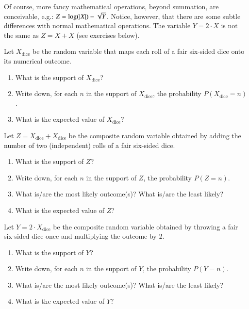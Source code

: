\documentclass[nobib,nofonts]{tufte-handout}
\newcommand{\mult}{\ensuremath{\cdot}}
\begin{document}
Of course, more fancy mathematical operations, beyond summation, are conceivable, e.g.: $Z = \log(\lvert X \rvert) - \sqrt{Y}$.
Notice, however, that there are some subtle differences with normal mathematical operations.
The variable $Y = 2 \mult X$ is not the same as $Z = X + X$ (see exercises below).

\bigskip
\noindent \colorbox{mygray}{\centering
  \begin{minipage}{1.0\textwidth}

    \begin{exercise}
      Let $X_{\text{dice}}$ be the random variable that maps each roll of a fair six-sided dice onto its numerical outcome.
      \begin{enumerate}
        \item What is the support of $X_{\text{dice}}$?
        \item Write down, for each $n$ in the support of $X_{\text{dice}}$, the probability $P(X_{\text{dice}}=n)$.
        \item What is the expected value of $X_{\text{dice}}$?
      \end{enumerate}
    \end{exercise}

    \begin{exercise}
      Let $Z = X_{\text{dice}} + X_{\text{dice}}$ be the composite random variable obtained by adding the number of two (independent) rolls of a fair six-sided dice.
      \begin{enumerate}
        \item What is the support of $Z$?
        \item Write down, for each $n$ in the support of $Z$, the probability $P(Z=n)$.
        \item What is/are the most likely outcome(s)? What is/are the least likely?
        \item What is the expected value of $Z$?
      \end{enumerate}
    \end{exercise}

    \begin{exercise}
      Let $Y = 2 \mult X_{\text{dice}}$ be the composite random variable obtained by throwing a fair six-sided dice once and multiplying the outcome by 2.
      \begin{enumerate}
        \item What is the support of $Y$?
        \item Write down, for each $n$ in the support of $Y$, the probability $P(Y=n)$.
        \item What is/are the most likely outcome(s)? What is/are the least likely?
        \item What is the expected value of $Y$?
      \end{enumerate}
    \end{exercise}

  \end{minipage}
}

\end{document}
